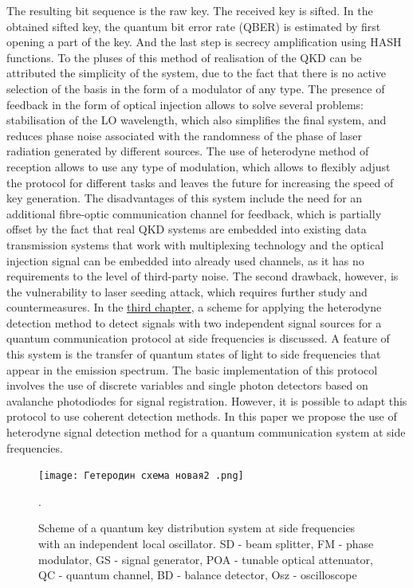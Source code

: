 The resulting bit sequence is the raw key. The received key is sifted. In the obtained sifted key, the quantum bit error rate (QBER) is estimated by first opening a part of the key. And the last step is secrecy amplification using HASH functions.
To the pluses of this method of realisation of the QKD can be attributed the simplicity of the system, due to the fact that there is no active selection of the basis in the form of a modulator of any type. The presence of feedback in the form of optical injection allows to solve several problems: stabilisation of the LO wavelength, which also simplifies the final system, and reduces phase noise associated with the randomness of the phase of laser radiation generated by different sources. The use of heterodyne method of reception allows to use any type of modulation, which allows to flexibly adjust the protocol for different tasks and leaves the future for increasing the speed of key generation.
\newline The disadvantages of this system include the need for an additional fibre-optic communication channel for feedback, which is partially offset by the fact that real QKD systems are embedded into existing data transmission systems that work with multiplexing technology and the optical injection signal can be embedded into already used channels, as it has no requirements to the level of third-party noise. The second drawback, however, is the vulnerability to laser seeding attack, which requires further study and countermeasures. 
\newpage In the \underline{third chapter}, a scheme for applying the heterodyne detection method to detect signals with two independent signal sources for a quantum communication protocol at side frequencies is discussed. A feature of this system is the transfer of quantum states of light to side frequencies that appear in the emission spectrum. The basic implementation of this protocol involves the use of discrete variables and single photon detectors based on avalanche photodiodes for signal registration. However, it is possible to adapt this protocol to use coherent detection methods. 
\newline In this paper we propose the use of heterodyne signal detection method for a quantum communication system at side frequencies.
\begin{figure}
    \centering
    \texttt{[image: Гетеродин схема новая2 .png]}
    \caption{Scheme of a quantum key distribution system at side frequencies with an independent local oscillator. SD - beam splitter, FM - phase modulator, GS - signal generator, POA - tunable optical attenuator, QC - quantum channel, BD - balance detector, Osz - oscilloscope}.
    \label{fig:het true scheme syn}
\end{figure}
